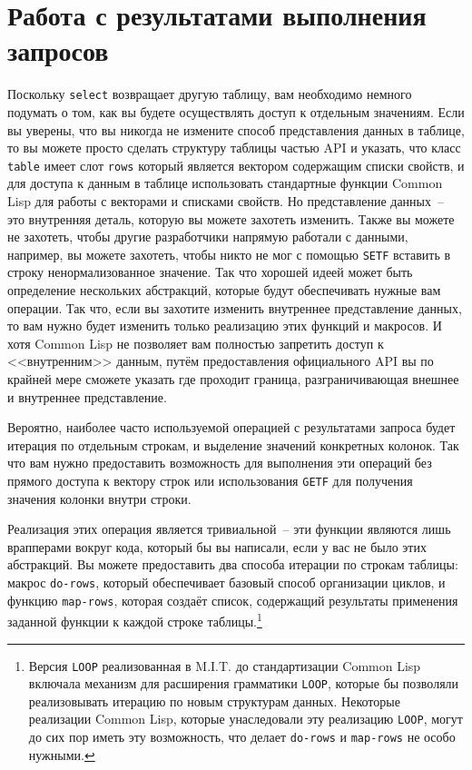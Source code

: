 \section{Работа с результатами выполнения запросов}

Поскольку \lstinline{select} возвращает другую таблицу, вам необходимо немного подумать о том,
как вы будете осуществлять доступ к отдельным значениям.  Если вы уверены, что вы никогда
не измените способ представления данных в таблице, то вы можете просто сделать структуру
таблицы частью API и указать, что класс \lstinline{table} имеет слот \lstinline{rows} который
является вектором содержащим списки свойств, и для доступа к данным в таблице использовать
стандартные функции Common Lisp для работы с векторами и списками свойств.  Но
представление данных~-- это внутренняя деталь, которую вы можете захотеть изменить.
Также вы можете не захотеть, чтобы другие разработчики напрямую работали с данными,
например, вы можете захотеть, чтобы никто не мог с помощью \lstinline{SETF} вставить в строку
ненормализованное значение.  Так что хорошей идеей может быть определение нескольких
абстракций, которые будут обеспечивать нужные вам операции.  Так что, если вы захотите
изменить внутреннее представление данных, то вам нужно будет изменить только реализацию
этих функций и макросов.  И хотя Common Lisp не позволяет вам полностью запретить доступ к
<<внутренним>> данным, путём предоставления официального API вы по крайней мере сможете
указать где проходит граница, разграничивающая внешнее и внутреннее представление.

Вероятно, наиболее часто используемой операцией с результатами запроса будет итерация по
отдельным строкам, и выделение значений конкретных колонок.  Так что вам нужно
предоставить возможность для выполнения эти операций без прямого доступа к вектору строк
или использования \lstinline{GETF} для получения значения колонки внутри строки.

Реализация этих операция является тривиальной~-- эти функции являются лишь врапперами
вокруг кода, который бы вы написали, если у вас не было этих абстракций.  Вы можете
предоставить два способа итерации по строкам таблицы: макрос \lstinline{do-rows}, который
обеспечивает базовый способ организации циклов, и функцию \lstinline{map-rows}, которая создаёт
список, содержащий результаты применения заданной функции к каждой строке
таблицы.\footnote{Версия \lstinline{LOOP} реализованная в M.I.T. до стандартизации Common Lisp
  включала механизм для расширения грамматики \lstinline{LOOP}, которые бы позволяли
  реализовывать итерацию по новым структурам данных.  Некоторые реализации Common Lisp,
  которые унаследовали эту реализацию \lstinline{LOOP}, могут до сих пор иметь эту возможность,
  что делает \lstinline{do-rows} и \lstinline{map-rows} не особо нужными.}

